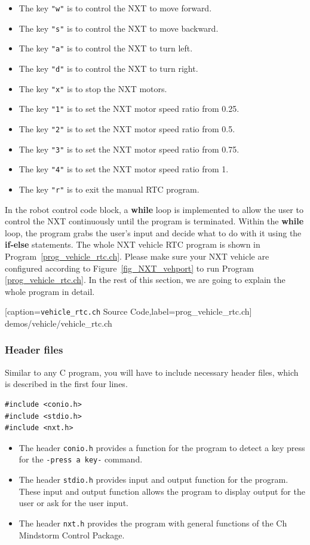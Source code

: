 \documentclass[11pt]{article}
\begin{document}
\begin{itemize}
\item The key {\tt "w"} is to control the NXT to move forward.
\item The key {\tt "s"} is to control the NXT to move backward.
\item The key {\tt "a"} is to control the NXT to turn left.
\item The key {\tt "d"} is to control the NXT to turn right.
\item The key {\tt "x"} is to stop the NXT motors.
\item The key {\tt "1"} is to set the NXT motor speed ratio from 0.25.
\item The key {\tt "2"} is to set the NXT motor speed ratio from 0.5.
\item The key {\tt "3"} is to set the NXT motor speed ratio from 0.75.
\item The key {\tt "4"} is to set the NXT motor speed ratio from 1.
\item The key {\tt "r"} is to exit the manual RTC program.
\end{itemize}
In the robot control code block, a {\bf while} loop is implemented to allow the 
user to control the NXT continuously until the program is terminated. Within the 
{\bf while} loop, the program grabs the user's input and decide what to do with 
it using the {\bf if-else} statements. The whole NXT vehicle RTC program 
is shown in Program~\ref{prog_vehicle_rtc.ch}. Please make sure your NXT vehicle 
are configured according to Figure~\ref{fig_NXT_vehport} to run Program~
\ref{prog_vehicle_rtc.ch}. In the rest of this section, we are going to explain 
the whole program in detail.

[caption={{\tt vehicle\_rtc.ch} Source Code},label=prog_vehicle_rtc.ch]
{demos/vehicle/vehicle_rtc.ch}

\subsubsection*{Header files}
Similar to any C program, you will have to include necessary header files, which 
is described in the first four lines.
\begin{lstlisting}
#include <conio.h>
#include <stdio.h>
#include <nxt.h>
\end{lstlisting}

\begin{itemize}
\item The header {\tt conio.h} provides a function for the program to detect a 
    key press for the {\tt -press a key-} command.
\item The header {\tt stdio.h} provides input and output function for the program. 
    These input and output function allows the program to display output for the 
    user or ask for the user input.
\item The header {\tt nxt.h} provides the program with general functions of the 
    Ch Mindstorm Control Package.
\end{itemize}
\end{document}

